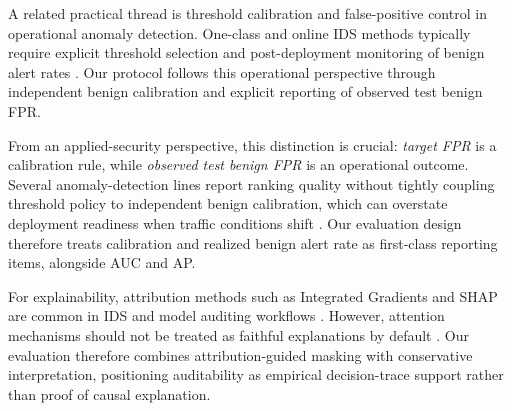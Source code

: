 A related practical thread is threshold calibration and false-positive control in operational anomaly detection. One-class and online IDS methods typically require explicit threshold selection and post-deployment monitoring of benign alert rates \cite{scholkopf2001ocsvm,mirsky2018kitsune,ruff2018deep}. Our protocol follows this operational perspective through independent benign calibration and explicit reporting of observed test benign FPR.

From an applied-security perspective, this distinction is crucial: \emph{target FPR} is a calibration rule, while \emph{observed test benign FPR} is an operational outcome. Several anomaly-detection lines report ranking quality without tightly coupling threshold policy to independent benign calibration, which can overstate deployment readiness when traffic conditions shift \cite{mirsky2018kitsune,ruff2018deep,manocchio2024flowtransformer}. Our evaluation design therefore treats calibration and realized benign alert rate as first-class reporting items, alongside AUC and AP.

For explainability, attribution methods such as Integrated Gradients and SHAP are common in IDS and model auditing workflows \cite{sundararajan2017axiomatic,lundberg2017shap,rahman2025explaining}. However, attention mechanisms should not be treated as faithful explanations by default \cite{jain2019attention}. Our evaluation therefore combines attribution-guided masking with conservative interpretation, positioning auditability as empirical decision-trace support rather than proof of causal explanation.
